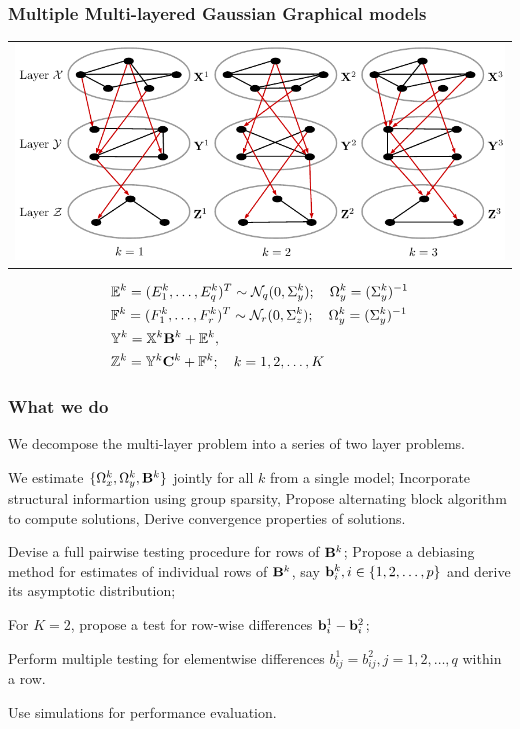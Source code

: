 \documentclass[10pt]{beamer}
\theoremstyle{definition}
\begin{document}
\begin{frame}
\frametitle{Multiple Multi-layered Gaussian Graphical models}

\begin{tabular}{c}
\includegraphics[width=.9\textwidth]{multi2layer}
\end{tabular}

%
\begin{align*}
& {\mathbb{E}}^k = (E_1^k, \ldots, E_q^k)^T \sim {\cal{N}}_q (0, \Sigma_y^k); \quad
\Omega_y^k = (\Sigma_y^k)^{-1}\\
& {\mathbb{F}}^k = (F_1^k, \ldots, F_r^k)^T \sim {\cal{N}}_r (0, \Sigma_z^k); \quad
\Omega_y^k = (\Sigma_y^k)^{-1}\\
& {\mathbb{Y}}^k = {\mathbb{X}}^k {\mathbf{B}}^k + {\mathbb{E}}^k,\\
& {\mathbb{Z}}^k = {\mathbb{Y}}^k {\mathbf{C}}^k + {\mathbb{F}}^k; \quad k = 1, 2, \ldots, K
\end{align*}
%

\end{frame}

\begin{frame} %
\frametitle{What we do}

\begin{outline}
\1 We decompose the multi-layer problem into a series of two layer problems.

\vspace{1em}
\1 We estimate $\{ \Omega_x^k, \Omega_y^k, {\mathbf{B}}^k \}$ jointly for all $k$ from a single model;
\2 Incorporate structural informartion using group sparsity,
\2 Propose alternating block algorithm to compute solutions,
\2 Derive convergence properties of solutions.

\vspace{1em}
\1 Devise a full pairwise testing procedure for rows of ${\mathbf{B}}^k$;
\2 Propose a debiasing method for estimates of individual rows of ${\mathbf{B}}^k$, say ${\bf{b}}_i^k, i \in \{ 1, 2, \ldots, p \}$ and derive its asymptotic distribution;

\2 For $K=2$, propose a test for row-wise differences ${\bf{b}}_i^1 - {\bf{b}}_i^2$;

\2 Perform multiple testing for elementwise differences $b_{ij}^1 = b_{ij}^2, j = 1, 2, \ldots, q$ within a row.

\vspace{1em}
\1 Use simulations for performance evaluation.
\end{outline}
\end{frame}
\end{document}
